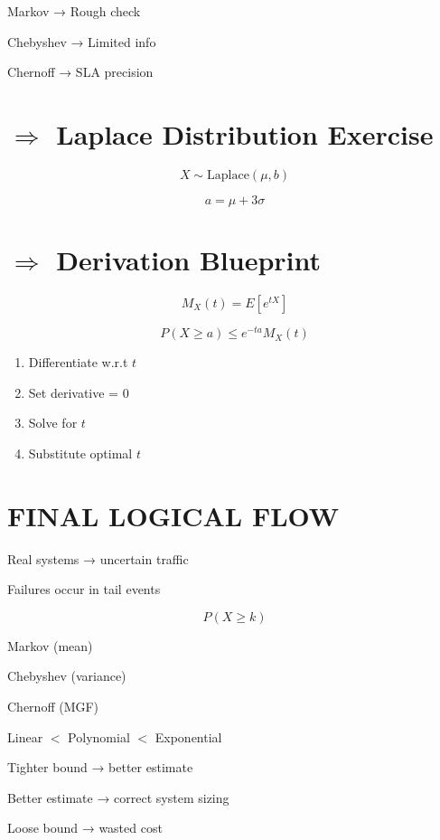 \documentclass{article}
\begin{document}
Markov → Rough check  

Chebyshev → Limited info  

Chernoff → SLA precision  

\vspace{0.6cm}


\section*{$\Rightarrow$ Laplace Distribution Exercise}

\[
X \sim \text{Laplace}(\mu,b)
\]

\[
a = \mu + 3\sigma
\]

\vspace{0.6cm}


\section*{$\Rightarrow$ Derivation Blueprint}

\[
M_X(t) = E[e^{tX}]
\]

\[
P(X \ge a) \le e^{-ta} M_X(t)
\]

\vspace{0.2cm}

\begin{enumerate}
\item Differentiate w.r.t $t$
\item Set derivative = 0
\item Solve for $t$
\item Substitute optimal $t$
\end{enumerate}

\vspace{0.6cm}


\section*{FINAL LOGICAL FLOW}

Real systems → uncertain traffic  

Failures occur in tail events  

\vspace{0.2cm}

\[
P(X \ge k)
\]

\vspace{0.2cm}

Markov (mean)  

Chebyshev (variance)  

Chernoff (MGF)  

\vspace{0.2cm}

Linear $<$ Polynomial $<$ Exponential  

Tighter bound → better estimate  

Better estimate → correct system sizing  

Loose bound → wasted cost  
\end{document}
